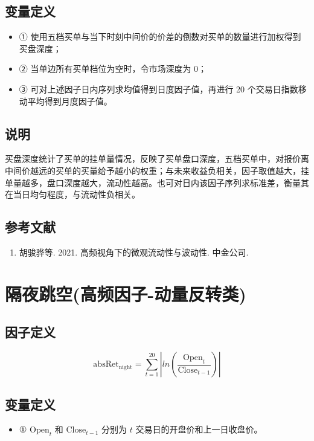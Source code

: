 \documentclass{article}
\begin{document}
\subsection{变量定义}
\begin{itemize}
    \item ① 使用五档买单与当下时刻中间价的价差的倒数对买单的数量进行加权得到买盘深度；
    \item ② 当单边所有买单档位为空时，令市场深度为 0；
    \item ③ 可对上述因子日内序列求均值得到日度因子值，再进行 20 个交易日指数移动平均得到月度因子值。
\end{itemize}

\subsection{说明}
买盘深度统计了买单的挂单量情况，反映了买单盘口深度，五档买单中，对报价离中间价越远的买单的买量给予越小的权重；与未来收益负相关，因子取值越大，挂单量越多，盘口深度越大，流动性越高。也可对日内该因子序列求标准差，衡量其在当日均匀程度，与流动性负相关。

\subsection{参考文献}
\begin{enumerate}
    \item 胡骏骅等. 2021. 高频视角下的微观流动性与波动性. 中金公司.
\end{enumerate}

\section{隔夜跳空(高频因子-动量反转类)}

\subsection{因子定义}

\begin{equation}
    \mathrm{absRet}_{\mathrm{night}} = \sum_{t=1}^{20} \left| ln (\frac{\mathrm{Open}_t}{\mathrm{Close}_{t-1}}  )\right|
\end{equation}

\subsection{变量定义}
\begin{itemize}
    \item ① \( \mathrm{Open}_t \) 和 \( \mathrm{Close}_{t-1} \) 分别为 \( t \) 交易日的开盘价和上一日收盘价。
\end{itemize}
\end{document}
